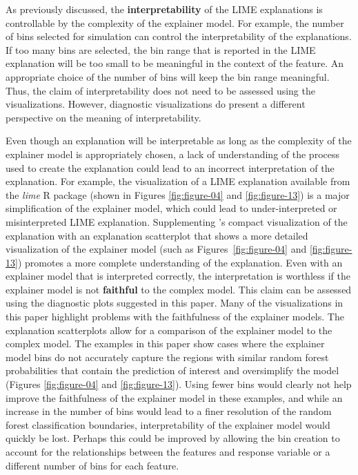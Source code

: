 \documentclass[AMS,STIX2COL]{WileyNJD-v2}\usepackage[]{graphicx}\usepackage[]{color}
\begin{document}
As previously discussed, the \textbf{interpretability} of the LIME explanations is controllable  by the complexity of the explainer model. For example, the number of bins selected for simulation can control the interpretability of the explanations. If too many bins are selected, the bin range that is reported in the LIME explanation will be too small to be meaningful in the context of the feature. An appropriate choice of the number of bins will keep the bin range meaningful. Thus, the claim of interpretability does not need to be assessed using the visualizations. However, diagnostic visualizations do present a different perspective on the meaning of interpretability.

Even though an explanation will be interpretable as long as the complexity of the explainer model is appropriately chosen, a lack of understanding of the process used to create the explanation could lead to an incorrect interpretation of the explanation. For example, the visualization of a LIME explanation available from the \emph{lime} R package \citep{pedersen:2020} (shown in Figures \ref{fig:figure-04} and \ref{fig:figure-13}) is a major simplification of the explainer model, which could lead to under-interpreted or misinterpreted LIME explanation. Supplementing \citet{pedersen:2020}'s compact visualization of the explanation with an explanation scatterplot that shows a more detailed visualization of the explainer model (such as Figures~\ref{fig:figure-04} and \ref{fig:figure-13}) promotes a more complete understanding of the explanation.
Even with an explainer model that is interpreted correctly, the interpretation is worthless if the explainer model is not \textbf{faithful} to the complex model. This claim can be assessed using the diagnostic plots suggested in this paper. Many of the visualizations in this paper highlight problems with the faithfulness of the explainer models. The explanation scatterplots allow for a comparison of the explainer model to the complex model. The examples in this paper show cases where the explainer model bins do not accurately capture the regions with similar random forest probabilities that contain the prediction of interest and oversimplify the model (Figures \ref{fig:figure-04} and \ref{fig:figure-13}). Using fewer bins would clearly not help improve the faithfulness of the explainer model in these examples, and while an increase in the number of bins would lead to a finer resolution of the random forest classification boundaries, interpretability of the explainer model would quickly be lost. Perhaps this could be improved by allowing the bin creation to account for the relationships between the features and response variable or a different number of bins for each feature.
\end{document}
